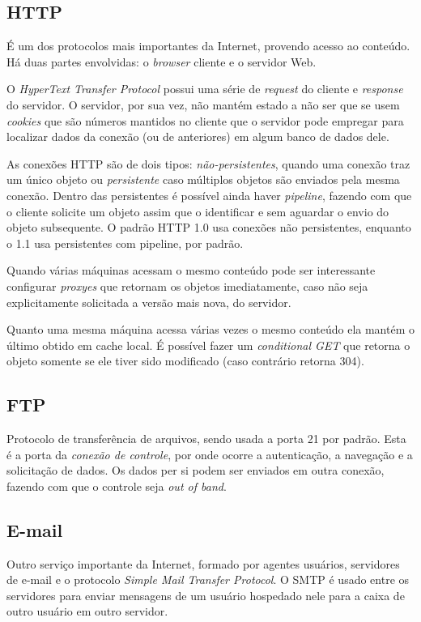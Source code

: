 \subsection{HTTP}

É um dos protocolos mais importantes da Internet, provendo acesso ao conteúdo.
Há duas partes envolvidas: o \emph{browser} cliente e o servidor Web.

O \emph{HyperText Transfer Protocol} possui uma série de \emph{request} do cliente e \emph{response} do servidor.
O servidor, por sua vez, não mantém estado a não ser que se usem \emph{cookies} que são números mantidos no cliente que o servidor pode empregar para localizar dados da conexão (ou de anteriores) em algum banco de dados dele.

As conexões HTTP são de dois tipos: \emph{não-persistentes}, quando uma conexão traz um único objeto ou \emph{persistente} caso múltiplos objetos são enviados pela mesma conexão. 
Dentro das persistentes é possível ainda haver \emph{pipeline}, fazendo com que o cliente solicite um objeto assim que o identificar e sem aguardar o envio do objeto subsequente.
O padrão HTTP 1.0 usa conexões não persistentes, enquanto o 1.1 usa persistentes com pipeline, por padrão.

Quando várias máquinas acessam o mesmo conteúdo pode ser interessante configurar \emph{proxyes} que retornam os objetos imediatamente, caso não seja explicitamente solicitada a versão mais nova, do servidor.

Quanto uma mesma máquina acessa várias vezes o mesmo conteúdo ela mantém o último obtido em cache local.
É possível fazer um \emph{conditional GET} que retorna o objeto somente se ele tiver sido modificado (caso contrário retorna 304).

\subsection{FTP}

Protocolo de transferência de arquivos, sendo usada a porta 21 por padrão.
Esta é a porta da \emph{conexão de controle}, por onde ocorre a autenticação, a navegação e a solicitação de dados.
Os dados per si podem ser enviados em outra conexão, fazendo com que o controle seja \emph{out of band}.

\subsection{E-mail}

Outro serviço importante da Internet, formado por agentes usuários, servidores de e-mail e o protocolo \emph{Simple Mail Transfer Protocol}.
O SMTP é usado entre os servidores para enviar mensagens de um usuário hospedado nele para a caixa de outro usuário em outro servidor.

